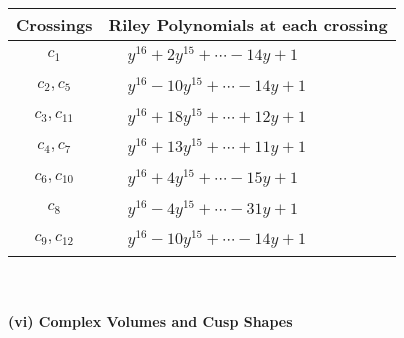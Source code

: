 \documentclass[1p]{elsarticle_modified}
\theoremstyle{definition}
\begin{document}
\begin{tabular}{m{50pt}|m{274pt}}
Crossings & \hspace{64pt}Riley Polynomials at each crossing \\
\hline $$\begin{aligned}c_{1}\end{aligned}$$&$\begin{aligned}
&y^{16}+2 y^{15}+\cdots-14 y+1
\end{aligned}$\\
\hline $$\begin{aligned}c_{2},c_{5}\end{aligned}$$&$\begin{aligned}
&y^{16}-10 y^{15}+\cdots-14 y+1
\end{aligned}$\\
\hline $$\begin{aligned}c_{3},c_{11}\end{aligned}$$&$\begin{aligned}
&y^{16}+18 y^{15}+\cdots+12 y+1
\end{aligned}$\\
\hline $$\begin{aligned}c_{4},c_{7}\end{aligned}$$&$\begin{aligned}
&y^{16}+13 y^{15}+\cdots+11 y+1
\end{aligned}$\\
\hline $$\begin{aligned}c_{6},c_{10}\end{aligned}$$&$\begin{aligned}
&y^{16}+4 y^{15}+\cdots-15 y+1
\end{aligned}$\\
\hline $$\begin{aligned}c_{8}\end{aligned}$$&$\begin{aligned}
&y^{16}-4 y^{15}+\cdots-31 y+1
\end{aligned}$\\
\hline $$\begin{aligned}c_{9},c_{12}\end{aligned}$$&$\begin{aligned}
&y^{16}-10 y^{15}+\cdots-14 y+1
\end{aligned}$\\
\hline
\end{tabular}\\~\\
\newpage\flushleft \textbf{(vi) Complex Volumes and Cusp Shapes}
\end{document}
